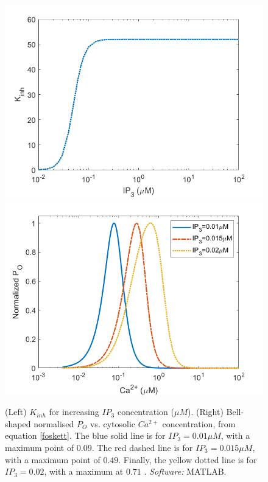 \begin{figure}[!htb]
  \includegraphics[width=\linewidth]{Chapters/3_IP3R_dynamics/extras/kinhvsp.png}
\endminipage\hfill
{}
  \includegraphics[width=\linewidth]{Chapters/3_IP3R_dynamics/extras/fig3bfoskettmatlab.png}
\endminipage\hfill
\caption{(Left) $K_{inh}$ for increasing $IP_3$ concentration ($\mu M$). (Right) Bell-shaped normalised $P_O$ vs. cytosolic $Ca^{2+}$ concentration, from equation \eqref{foskett}. The blue solid line is for $IP_3=0.01 \mu M$, with a maximum point of $0.09$. The red dashed line is for $IP_3=0.015\mu M$, with a maximum point of $0.49$. Finally, the yellow dotted line is for $IP_3=0.02$, with a maximum at $0.71$ \cite{Mak1998}. \textit{Software:} MATLAB.}\label{kinhvsp}
\end{figure}

